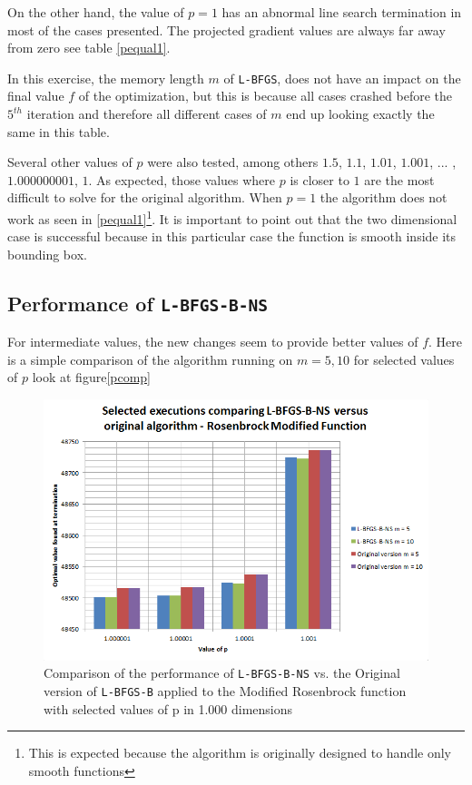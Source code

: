 On the other hand, the value of $p = 1$ has an abnormal line search termination in most of the cases presented. The projected gradient values are always far away from zero see table \eqref{pequal1}. 

In this exercise, the memory length $m$ of \texttt{L-BFGS}, does not have an impact on the final value $f$ of the optimization, but this is because all cases crashed before the $5^{th}$ iteration and therefore all different cases of $m$ end up looking exactly the same in this table.

Several other values of $p$ were also tested, among others $1.5$, $1.1$, $1.01$, $1.001$, ... , $1.000000001$, $1$. As expected, those values where $p$ is closer to $1$ are the most difficult to solve for the original algorithm. When $p=1$ the algorithm does not work as seen in \eqref{pequal1}\footnote{This is expected because the algorithm is originally designed to handle only smooth functions}. It is important to point out that the two dimensional case is successful because in this particular case the function is smooth inside its bounding box.

\subsection{Performance of \texttt{L-BFGS-B-NS}}

For intermediate values, the new changes seem to provide better values of $f$. Here is a simple comparison of the algorithm running on $m = 5,10$ for selected values of $p$ look at figure\eqref{pcomp}

\begin{figure}
\begin{center}
\includegraphics[scale=0.75]{Figures/ComparisonNewOld.PNG}
\caption[Comparison of selected values of the Modified Rosenbrock function]{Comparison of the performance of \texttt{L-BFGS-B-NS} vs. the Original version of \texttt{L-BFGS-B} applied to the Modified Rosenbrock function with selected values of p in 1.000 dimensions}
\label{pcomp}
\end{center}
\end{figure}

